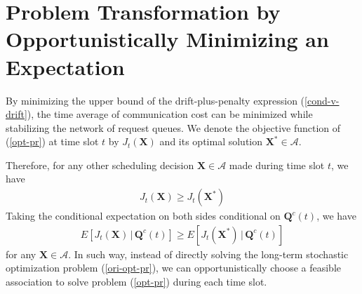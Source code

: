 \documentclass[10pt,journal,compsoc]{IEEEtran}
\begin{document}
\appendices
\section{Problem Transformation by Opportunistically Minimizing an Expectation}

By minimizing the upper bound of the drift-plus-penalty expression (\ref{cond-v-drift}), the time average of communication cost can be minimized while stabilizing the network of request queues. 
We denote the objective function of (\ref{opt-pr}) at time slot $t$ by $J_t(\mathbf{X})$ and its optimal solution $\mathbf{X}^* \in \mathcal{A}$.

Therefore, for any other scheduling decision $\mathbf{X} \in \mathcal{A}$ made during time slot $t$, we have
\begin{equation}
	\begin{array}{c}
		J_t(\mathbf{X}) \ge J_t(\mathbf{X}^*)
	\end{array}
\end{equation}
Taking the conditional expectation on both sides conditional on $\mathbf{Q}^c(t)$, we have
\begin{equation}
	\begin{array}{c}
		E\left[J_t(\mathbf{X})\,|\,\mathbf{Q}^c(t)\right] \ge E\left[J_t(\mathbf{X}^*)\,|\,\mathbf{Q}^c(t)\right]
	\end{array}
\end{equation}
for any $\mathbf{X} \in \mathcal{A}$. In such way, instead of directly solving the long-term stochastic optimization problem (\ref{ori-opt-pr}), we can opportunistically choose a feasible association to solve problem (\ref{opt-pr}) during each time slot. 
\end{document}
